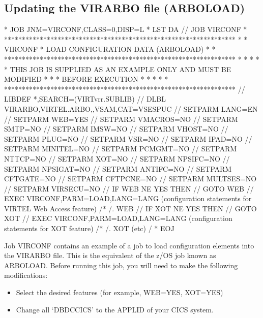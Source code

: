\documentclass[letterpaper,10pt,english]{sphinxmanual}
\begin{document}
\subsection{Updating the VIRARBO file (ARBOLOAD)}
\label{\detokenize{Installation_Guide:updating-the-virarbo-file-arboload}}
\begin{sphinxVerbatim}[commandchars=\\\{\}]
* \PYGZdl{}\PYGZdl{} JOB JNM=VIRCONF,CLASS=0,DISP=L
* \PYGZdl{}\PYGZdl{} LST DA
// JOB VIRCONF
* *****************************************************************
* * VIRCONF * LOAD CONFIGURATION DATA (ARBOLOAD) *
* *****************************************************************
* * *
* * THIS JOB IS SUPPLIED AS AN EXAMPLE ONLY AND MUST BE MODIFIED *
* * BEFORE EXECUTION *
* * *
* *****************************************************************
// LIBDEF *,SEARCH=(VIRTvrr.SUBLIB)
// DLBL VIRARBO,\PYGZsq{}VIRTEL.ARBO\PYGZsq{},,VSAM,CAT=VSESPUC
// SETPARM LANG=EN
// SETPARM WEB=YES
// SETPARM VMACROS=NO
// SETPARM SMTP=NO
// SETPARM IMSW=NO
// SETPARM VHOST=NO
// SETPARM PLUG=NO
// SETPARM VSR=NO
// SETPARM IPAD=NO
// SETPARM MINITEL=NO
// SETPARM PCMGMT=NO
// SETPARM NTTCP=NO
// SETPARM XOT=NO
// SETPARM NPSIFC=NO
// SETPARM NPSIGAT=NO
// SETPARM ANTIFC=NO
// SETPARM CFTGATE=NO
// SETPARM CFTPCNE=NO
// SETPARM MULTSES=NO
// SETPARM VIRSECU=NO
// IF WEB NE YES THEN
// GOTO WEB
// EXEC VIRCONF,PARM=\PYGZsq{}LOAD,LANG=\PYGZam{}LANG\PYGZsq{}
  (configuration statements for VIRTEL Web Access feature)
/*
/. WEB
// IF XOT NE YES THEN
// GOTO XOT
// EXEC VIRCONF,PARM=\PYGZsq{}LOAD,LANG=\PYGZam{}LANG\PYGZsq{}
  (configuration statements for XOT feature)
/*
/. XOT
  (etc)
/\PYGZam{}
* \PYGZdl{}\PYGZdl{} EOJ
\end{sphinxVerbatim}

\sphinxAtStartPar
{}

\sphinxAtStartPar
Job VIRCONF contains an example of a job to load configuration elements into the VIRARBO file. This is the equivalent of the z/OS job known as ARBOLOAD. Before running this job, you will need to make the following modifications:
\begin{itemize}
\item {} 
\sphinxAtStartPar
Select the desired features (for example, WEB=YES, XOT=YES)

\item {} 
\sphinxAtStartPar
Change all ‘DBDCCICS’ to the APPLID of your CICS system.

\end{itemize}
\end{document}

